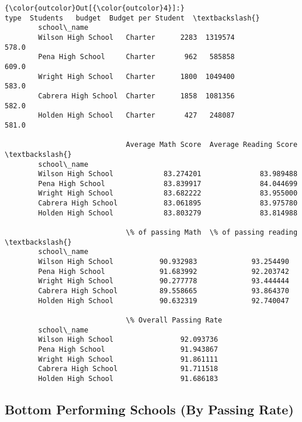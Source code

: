 \documentclass[11pt]{article}
\begin{document}
\begin{Verbatim}[commandchars=\\\{\}]
{\color{outcolor}Out[{\color{outcolor}4}]:}                         type  Students   budget  Budget per Student  \textbackslash{}
        school\_name                                                           
        Wilson High School   Charter      2283  1319574               578.0   
        Pena High School     Charter       962   585858               609.0   
        Wright High School   Charter      1800  1049400               583.0   
        Cabrera High School  Charter      1858  1081356               582.0   
        Holden High School   Charter       427   248087               581.0   
        
                             Average Math Score  Average Reading Score  \textbackslash{}
        school\_name                                                      
        Wilson High School            83.274201              83.989488   
        Pena High School              83.839917              84.044699   
        Wright High School            83.682222              83.955000   
        Cabrera High School           83.061895              83.975780   
        Holden High School            83.803279              83.814988   
        
                             \% of passing Math  \% of passing reading  \textbackslash{}
        school\_name                                                    
        Wilson High School           90.932983             93.254490   
        Pena High School             91.683992             92.203742   
        Wright High School           90.277778             93.444444   
        Cabrera High School          89.558665             93.864370   
        Holden High School           90.632319             92.740047   
        
                             \% Overall Passing Rate  
        school\_name                                  
        Wilson High School                92.093736  
        Pena High School                  91.943867  
        Wright High School                91.861111  
        Cabrera High School               91.711518  
        Holden High School                91.686183  
\end{Verbatim}
            
    \subsection{Bottom Performing Schools (By Passing
Rate)}\label{bottom-performing-schools-by-passing-rate}
\end{document}
